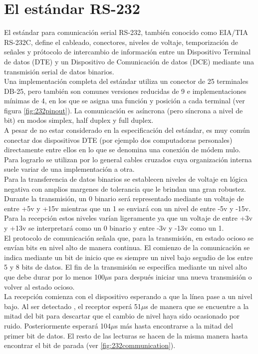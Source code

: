\documentclass[letterpaper,openright,12pt]{book}
\begin{document}
\section{El estándar RS-232}
El estándar para comunicación serial RS-232, también conocido como EIA/TIA RS-232C, define el cableado, conectores, niveles de voltaje, temporización de señales y prótocolo de intercambio de información entre un Dispositivo Terminal de datos (DTE) y un Dispositivo de Comunicación de datos (DCE) mediante una transmisión serial de datos binarios.\\
Una implementación completa del estándar utiliza un conector de 25 terminales DB-25, pero también son comunes versiones reducidas de 9 e implementaciones mínimas de 4, en los que se asigna una función y posición a cada terminal (ver figura \ref{fig:232pinout}). La comunicación es asíncrona (pero síncrona a nivel de bit) en modos simplex, half duplex y full duplex.\\
A pesar de no estar considerado en la especificación del estándar, es muy común conectar dos dispositivos DTE (por ejemplo dos computadoras personales) directamente entre ellos en lo que se denomina una conexión de módem nulo. Para lograrlo se utilizan por lo general cables cruzados cuya organización interna suele variar de una implementación a otra.\\
Para la transferencia de datos binarios se establecen niveles de voltaje en lógica negativa con amplios margenes de tolerancia que le brindan una gran robustez. Durante la transmisión, un 0 binario será representado mediante un voltaje de entre +5v y +15v mientras que un 1 se enviará con un nivel de entre -5v y -15v. Para la recepción estos niveles varían ligeramente ya que un voltaje de entre +3v y +13v se interpretará como un 0 binario y entre -3v y -13v como un 1.\\
El protocolo de comunicación señala que, para la transmisión, en estado ocioso se envían bits en nivel alto de manera continua. El comienzo de la comunicación se indica mediante un bit de inicio que es siempre un nivel bajo segudio de los entre 5 y 8 bits de datos. El fin de la transmisión se especifíca mediante un nivel alto que debe durar por lo menos 100$\mu$s para después iniciar una nueva transmisión o volver al estado ocioso.\\
La recepción comienza con el dispositivo esperando a que la línea pase a un nivel bajo. Al ser detectado , el receptor esperá 51$\mu$s de manera que se encuentre a la mitad del bit para descartar que el cambio de nivel haya sido ocasionado por ruido. Posteriormente esperará 104$\mu$s más hasta encontrarse a la mitad del primer bit de datos. El resto de las lecturas se hacen de la misma manera hasta encontrar el bit de parada (ver \ref{fig:232communication})\cite{omega}.\\
\end{document}
